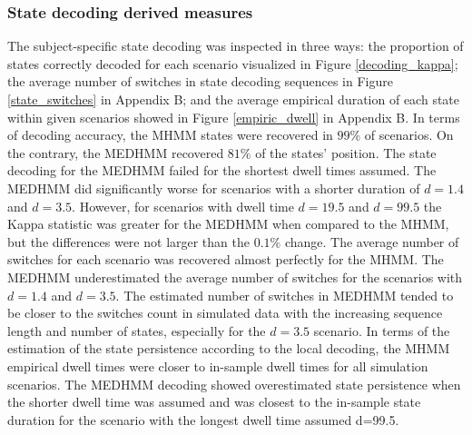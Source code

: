 \subsubsection{State decoding derived measures}
The subject-specific state decoding was inspected in three ways: the proportion of states correctly decoded for each scenario visualized in Figure \ref{decoding_kappa}; the average number of switches in state decoding sequences in Figure \ref{state_switches} in Appendix B; and the average empirical duration of each state within given scenarios showed in Figure \ref{empiric_dwell} in Appendix B. In terms of decoding accuracy, the MHMM states were recovered in $99\%$ of scenarios. On the contrary, the MEDHMM recovered $81\%$ of the states' position. The state decoding for the MEDHMM failed for the shortest dwell times assumed. The MEDHMM did significantly worse for scenarios with a shorter duration of $d=1.4$ and $d=3.5$. However, for scenarios with dwell time $d=19.5$ and $d=99.5$ the Kappa statistic was greater for the MEDHMM when compared to the MHMM, but the differences were not larger than the $0.1\%$ change. The average number of switches for each scenario was recovered almost perfectly for the MHMM. The MEDHMM underestimated the average number of switches for the scenarios with $d=1.4$ and $d=3.5$. The estimated number of switches in MEDHMM tended to be closer to the switches count in simulated data with the increasing sequence length and number of states, especially for the $d=3.5$ scenario. In terms of the estimation of the state persistence according to the local decoding, the MHMM empirical dwell times were closer to in-sample dwell times for all simulation scenarios. The MEDHMM decoding showed overestimated state persistence when the shorter dwell time was assumed and was closest to the in-sample state duration for the scenario with the longest dwell time assumed d=99.5. 

